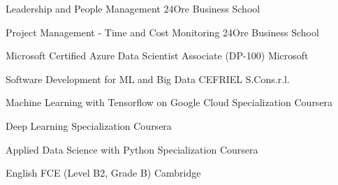 

\begin{cvhonors}

  \cvhonor
    {Leadership and People Management } %
    {24Ore Business School} %
    {} %
    {} %

  \cvhonor
    {Project Management - Time and Cost Monitoring} %
    {24Ore Business School} %
    {} %
    {} %

  \cvhonor
    {Microsoft Certified Azure Data Scientist Associate (DP-100)} %
    {Microsoft} %
    {} %
    {} %

  \cvhonor
    {Software Development for ML and Big Data} %
    {CEFRIEL S.Cons.r.l.} %
    {} %
    {} %

  \cvhonor
    {Machine Learning with Tensorflow on Google Cloud Specialization} %
    {Coursera} %
    {} %
    {} %

  \cvhonor
    {Deep Learning Specialization} %
    {Coursera} %
    {} %
    {} %

  \cvhonor
    {Applied Data Science with Python Specialization} %
    {Coursera} %
    {} %
    {} %
    
  \cvhonor
    {English FCE (Level B2, Grade B)} %
    {Cambridge} %
    {} %
    {} %

\end{cvhonors}